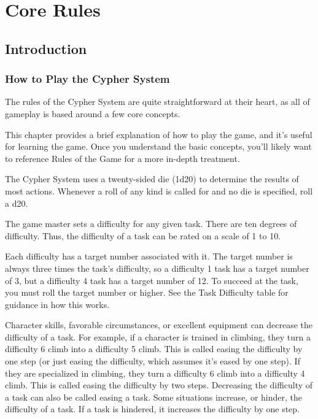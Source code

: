 \part{Core Rules}

\chapter{Introduction}

\begin{multicols}{2}

\section{How to Play the Cypher System}
The rules of the Cypher System are quite straightforward at their heart, as all of gameplay is based around a few core concepts.

This chapter provides a brief explanation of how to play the game, and it’s useful for learning the game. Once you understand the basic concepts, you’ll likely want to reference Rules of the Game for a more in-depth treatment. 

The Cypher System uses a twenty-sided die (1d20) to determine the results of most actions. Whenever a roll of any kind is called for and no die is specified, roll a d20.

The game master sets a difficulty for any given task. There are ten degrees of difficulty. Thus, the difficulty of a task can be rated on a scale of 1 to 10.

Each difficulty has a target number associated with it. The target number is always three times the task’s difficulty, so a difficulty 1 task has a target number of 3, but a difficulty 4 task has a target number of 12. To succeed at the task, you must roll the target number or higher. See the Task Difficulty table for guidance in how this works.

Character skills, favorable circumstances, or excellent equipment can decrease the difficulty of a task. For example, if a character is trained in climbing, they turn a difficulty 6 climb into a difficulty 5 climb. This is called easing the difficulty by one step (or just easing the difficulty, which assumes it’s eased by one step). If they are specialized in climbing, they turn a difficulty 6 climb into a difficulty 4 climb. This is called easing the difficulty by two steps. Decreasing the difficulty of a task can also be called easing a task. Some situations increase, or hinder, the difficulty of a task. If a task is hindered, it increases the difficulty by one step.


\end{multicols}
